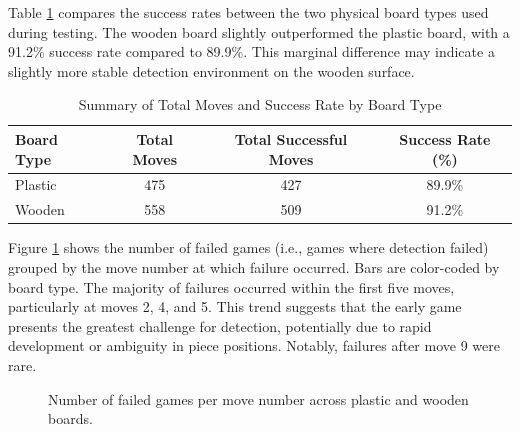 Table \ref{tab:board-type-accuracy} compares the success rates between the two physical board types used during testing. The wooden board slightly outperformed the plastic board, with a 91.2\% success rate compared to 89.9\%. This marginal difference may indicate a slightly more stable detection environment on the wooden surface. \\


\begin{table}[htbp]
\centering
\caption{Summary of Total Moves and Success Rate by Board Type}
\label{tab:board-type-accuracy}
\begin{tabular}{lccc}
\toprule
\textbf{Board Type} & \textbf{Total Moves} & \textbf{Total Successful Moves} & \textbf{Success Rate (\%)} \\
\midrule
Plastic & 475 & 427 & 89.9\% \\
Wooden  & 558 & 509 & 91.2\% \\
\bottomrule
\end{tabular}
\end{table}


Figure \ref{fig:move-failures} shows the number of failed games (i.e., games where detection failed) grouped by the move number at which failure occurred. Bars are color-coded by board type. The majority of failures occurred within the first five moves, particularly at moves 2, 4, and 5. This trend suggests that the early game presents the greatest challenge for detection, potentially due to rapid development or ambiguity in piece positions. Notably, failures after move 9 were rare. \\


\begin{figure}[h!]
\centering
{}
\caption{Number of failed games per move number across plastic and wooden boards.}
\label{fig:move-failures}
\end{figure}


